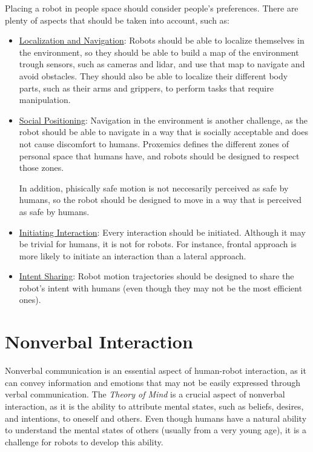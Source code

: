 Placing a robot in people space should consider people's preferences. There are plenty of aspects that should be taken into account, such as:
\begin{itemize}
    \item \ul{Localization and Navigation}: Robots should be able to localize themselves in the environment, so they should be able to build a map of the environment trough sensors, such as cameras and lidar, and use that map to navigate and avoid obstacles. They should also be able to localize their different body parts, such as their arms and grippers, to perform tasks that require manipulation.
    \item \ul{Social Positioning}: Navigation in the environment is another challenge, as the robot should be able to navigate in a way that is socially acceptable and does not cause discomfort to humans.
    Proxemics defines the different zones of personal space that humans have, and robots should be designed to respect those zones.

    In addition, phisically safe motion is not neccesarily perceived as safe by humans, so the robot should be designed to move in a way that is perceived as safe by humans.
    \item \ul{Initiating Interaction}: Every interaction should be initiated. Although it may be trivial for humans, it is not for robots. For instance, frontal approach is more likely to initiate an interaction than a lateral approach.
    \item \ul{Intent Sharing}: Robot motion trajectories should be designed to share the robot's intent with humans (even though they may not be the most efficient ones).
\end{itemize}

\section{Nonverbal Interaction}

Nonverbal communication is an essential aspect of human-robot interaction, as it can convey information and emotions that may not be easily expressed through verbal communication. The \emph{Theory of Mind} is a crucial aspect of nonverbal interaction, as it is the ability to attribute mental states, such as beliefs, desires, and intentions, to oneself and others. Even though humans have a natural ability to understand the mental states of others (usually from a very young age), it is a challenge for robots to develop this ability.

